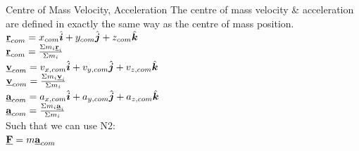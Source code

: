 \begin{frame}{Centre of Mass Velocity, Acceleration}
\small
The centre of mass velocity \& acceleration are defined in exactly the same way as the centre of mass position.\\[2ex]

$\underline{\mathbf{r}}_{com} =x_{com} \hat{\boldsymbol{i}} + y_{com} \hat{\boldsymbol{j}}  + z_{com} \hat{\boldsymbol{k}} $\\
$\underline{\mathbf{r}}_{com} = \frac{\Sigma m_i \underline{\mathbf{r}}_i}{\Sigma m_i}$\\[2ex]

$\underline{\mathbf{v}}_{com} =v_{x,com} \hat{\boldsymbol{i}} + v_{y,com} \hat{\boldsymbol{j}}  + v_{z,com} \hat{\boldsymbol{k}} $\\
$\underline{\mathbf{v}}_{com} = \frac{\Sigma m_i \underline{\mathbf{v}}_i}{\Sigma m_i}$\\[2ex]

$\underline{\mathbf{a}}_{com} =a_{x,com} \hat{\boldsymbol{i}} + a_{y,com} \hat{\boldsymbol{j}}  + a_{z,com} \hat{\boldsymbol{k}} $\\
$\underline{\mathbf{a}}_{com} = \frac{\Sigma m_i \underline{\mathbf{a}}_i}{\Sigma m_i}$\\[2ex]

Such that we can use N2:\\[1ex]

$\underline{\mathbf{F}} = m \underline{\mathbf{a}}_{com}$


\end{frame}



